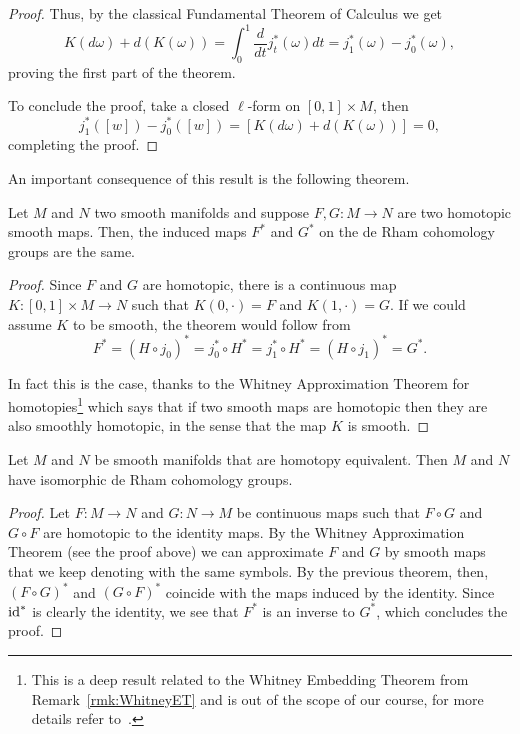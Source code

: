 \begin{proof}
  Thus, by the classical Fundamental Theorem of Calculus we get
  \begin{equation}
  K(d\omega) + d(K(\omega)) = \int_0^1 \frac{d}{dt} j_t^*(\omega) dt = j_1^*(\omega) - j_0^*(\omega),
  \end{equation}
  proving the first part of the theorem.

  To conclude the proof, take a closed $\ell$-form on $[0,1]\times M$, then
  \begin{equation}
    j_1^*([w]) - j_0^*([w]) = [K(d\omega) + d(K(\omega))] = 0,
  \end{equation}
  completing the proof.
\end{proof}

An important consequence of this result is the following theorem.

\begin{theorem}
Let $M$ and $N$ two smooth manifolds and suppose $F,G: M\to N$ are two homotopic smooth maps.
Then, the induced maps $F^*$ and $G^*$ on the de Rham cohomology groups are the same.
\end{theorem}
\begin{proof}
Since $F$ and $G$ are homotopic, there is a continuous map $K: [0,1]\times M \to N$ such that $K(0,\cdot) = F$ and $K(1,\cdot) = G$.
If we could assume $K$ to be smooth, the theorem would follow from
\begin{equation}
  F^* = (H\circ j_0)^* = j_0^*\circ H^* = j_1^*\circ H^* = (H\circ j_1)^* = G^*.
\end{equation}

In fact this is the case, thanks to the Whitney Approximation Theorem for homotopies\footnote{This is a deep result related to the Whitney Embedding Theorem from Remark~\ref{rmk:WhitneyET} and is out of the scope of our course, for more details refer to~\cite[Chapter 6 and Theorems 6.26 and 9.27]{book:lee}.} which says that if two smooth maps are homotopic then they are also smoothly homotopic, in the sense that the map $K$ is smooth.
\end{proof}

\begin{corollary}\label{cor:deRhamIso}
  Let $M$ and $N$ be smooth manifolds that are homotopy equivalent. Then $M$ and $N$ have isomorphic de Rham cohomology groups.
\end{corollary}
\begin{proof}
  Let $F:M\to N$ and $G:N\to M$ be continuous maps such that $F\circ G$ and $G\circ F$ are homotopic to the identity maps. 
  By the Whitney Approximation Theorem (see the proof above) we can approximate $F$ and $G$ by smooth maps that we keep denoting with the same symbols.
  By the previous theorem, then, $(F\circ G)^*$ and $(G\circ F)^*$ coincide with the maps induced by the identity.
  Since $\operatorname{id}^*$ is clearly the identity, we see that $F^*$ is an inverse to $G^*$, which concludes the proof.
\end{proof}

